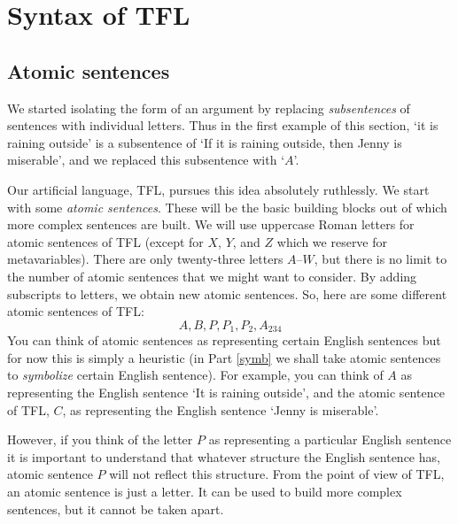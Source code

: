 
\chapter{Syntax of TFL}\label{ch:syntfl}
\section{Atomic sentences}\label{sec:as}

We started isolating the form of an argument by replacing  \emph{subsentences} of sentences with individual letters. Thus in the first example of this section, `it is raining outside' is a subsentence of `If it is raining outside, then Jenny is miserable', and we replaced this subsentence with `$A$'.

Our artificial language, TFL, pursues this idea absolutely ruthlessly. We start with some \emph{atomic sentences}. These will be the basic building blocks out of which more complex sentences are built. We will use uppercase Roman letters for atomic sentences of TFL (except for $X$, $Y$, and $Z$ which we reserve for metavariables). There are only twenty-three letters $A$--$W$, but there is no limit to the number of atomic sentences that we might want to consider. By adding subscripts to letters, we obtain new atomic sentences. So, here are some different atomic sentences of TFL:
	$$A, B, P, P_1, P_2, A_{234}$$
You can think of atomic sentences as representing certain English sentences but for now this is simply a heuristic (in Part \ref{symb} we shall take atomic sentences to \emph{symbolize} certain English sentence).  For example, you can think of $A$ as representing the English sentence `It is raining outside', and the atomic sentence of TFL, $C$, as representing the English sentence `Jenny is miserable'.

However, if you think of the letter $P$ as representing a particular English sentence it is important to understand that whatever structure the English sentence has, atomic sentence $P$ will not reflect this structure. From the point of view of TFL, an atomic sentence is just a letter. It can be used to build more complex sentences, but it cannot be taken apart.


